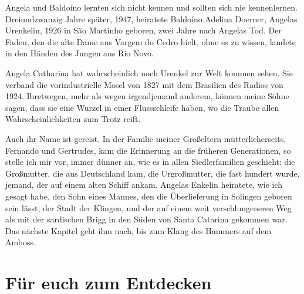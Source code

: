 \documentclass[
  ngerman,
  11pt,
  openany]{book}
\begin{document}
Angela und Baldoíno lernten sich nicht kennen und sollten sich nie
kennenlernen. Dreiundzwanzig Jahre später, 1947, heiratete Baldoíno
Adelina Doerner, Angelas Urenkelin, 1926 in São Martinho geboren, zwei
Jahre nach Angelas Tod. Der Faden, den die alte Dame aus Vargem do Cedro
hielt, ohne es zu wissen, landete in den Händen des Jungen aus Rio Novo.

Angela Catharina hat wahrscheinlich noch Urenkel zur Welt kommen sehen.
Sie verband die vorindustrielle Mosel von 1827 mit dem Brasilien des
Radios von 1924. Ihretwegen, mehr als wegen irgendjemand anderem, können
meine Söhne sagen, dass sie eine Wurzel in einer Flussschleife haben, wo
die Traube allen Wahrscheinlichkeiten zum Trotz reift.

Auch ihr Name ist gereist. In der Familie meiner Großeltern
mütterlicherseits, Fernando und Gertrudes, kam die Erinnerung an die
früheren Generationen, so stelle ich mir vor, immer dünner an, wie es in
allen Siedlerfamilien geschieht: die Großmutter, die aus Deutschland
kam, die Urgroßmutter, die fast hundert wurde, jemand, der auf einem
alten Schiff ankam. Angelas Enkelin heiratete, wie ich gesagt habe, den
Sohn eines Mannes, den die Überlieferung in Solingen geboren sein lässt,
der Stadt der Klingen, und der auf einem weit verschlungeneren Weg als
mit der sardischen Brigg in den Süden von Santa Catarina gekommen war.
Das nächste Kapitel geht ihm nach, bis zum Klang des Hammers auf dem
Amboss.

\section{Für euch zum Entdecken}\label{fuxfcr-euch-zum-entdecken-8}
\end{document}
